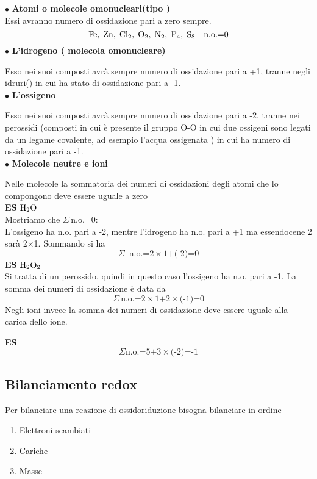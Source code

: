 $\bullet$ \textbf{Atomi o molecole omonucleari(tipo )}\\
Essi avranno numero di ossidazione pari a zero sempre.
$$\ce{Fe,\;Zn,\;Cl_2,\;O_2,\;N_2,\;P_4,\;S_8}\quad \text{n.o.=0}$$
$\bullet$  \textbf{L'idrogeno ( molecola omonucleare)}

Esso nei suoi composti avrà sempre numero di ossidazione pari a +1, tranne negli idruri() in cui ha stato di ossidazione pari a -1.\\
$\bullet$  \textbf{L'ossigeno}

Esso nei suoi composti avrà sempre numero di ossidazione pari a -2, tranne nei perossidi (composti in cui è presente il gruppo O-O in cui due ossigeni sono legati da un legame covalente, ad esempio l'acqua ossigenata ) in cui ha numero di ossidazione pari a -1.\\
$\bullet$  \textbf{Molecole neutre e ioni}

Nelle molecole la sommatoria dei numeri di ossidazioni degli atomi che lo compongono deve essere uguale a zero\\

\textbf{ES} $\ce{H_2O}\qquad$\\
Mostriamo che $\Sigma\,$n.o.=0:\\
L'ossigeno ha n.o. pari a -2, mentre l'idrogeno ha n.o. pari a +1 ma essendocene 2 sarà 2$\times$1. Sommando si ha\\
$$\Sigma\,\text{ n.o.=2} \times \text{1+(-2)=0}$$
\textbf{ES} $\ce{H_2O_2}$\\
Si tratta di un perossido, quindi in questo caso l'ossigeno ha n.o. pari a -1. La somma dei numeri di ossidazione è data da\\
$$\Sigma\,\text{n.o.=2} \times \text{1+2} \times \text{(-1)=0}$$
Negli ioni invece la somma dei numeri di ossidazione deve essere uguale alla carica dello ione.

\textbf{ES} 
$$\Sigma \text{n.o.=5+3} \times \text{(-2)=-1}$$
\subsection{Bilanciamento redox}
Per bilanciare una reazione di ossidoriduzione bisogna bilanciare in ordine
\begin{enumerate}
    \item Elettroni scambiati
    \item Cariche
    \item Masse
  \end{enumerate}
